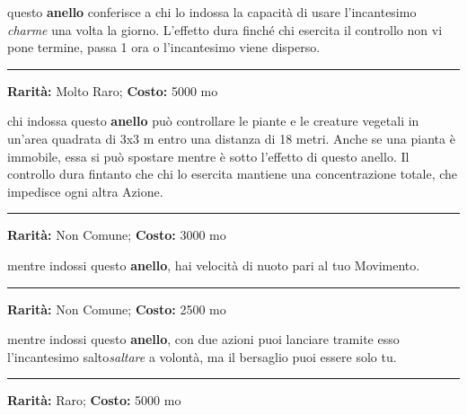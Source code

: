\begin{multicols}{2}
questo \textbf{anello} conferisce a chi lo indossa la capacità di usare l'incantesimo \emph{charme} una volta la giorno. L'effetto dura finché chi esercita il controllo non vi pone termine, passa 1 ora o l'incantesimo viene disperso.

\smallskip\noindent\rule{\linewidth}{2pt}  \hypertarget{AnellodelControllodellepiante}{}\smallskip{}\noindent\label{AnellodelControllodellepiante}

\textbf{Rarità:} Molto Raro; \textbf{Costo:} 5000 mo

chi indossa questo \textbf{anello} può controllare le piante e le creature vegetali in un'area quadrata di 3x3 m entro una distanza di 18 metri. Anche se una pianta è immobile, essa si può spostare mentre è sotto l'effetto di questo anello. Il controllo dura fintanto che chi lo esercita mantiene una concentrazione totale, che impedisce ogni altra Azione.

\smallskip\noindent\rule{\linewidth}{2pt}  \hypertarget{AnellodelNuoto}{}\smallskip{}\noindent\label{AnellodelNuoto}

\textbf{Rarità:} Non Comune; \textbf{Costo:} 3000 mo

mentre indossi questo \textbf{anello}, hai velocità di nuoto pari al tuo Movimento.

\smallskip\noindent\rule{\linewidth}{2pt}  \hypertarget{AnellodelSalto}{}\smallskip{}\noindent\label{AnellodelSalto}

\textbf{Rarità:} Non Comune; \textbf{Costo:} 2500 mo

mentre indossi questo \textbf{anello}, con due azioni puoi lanciare tramite esso l'incantesimo salto\emph{saltare} a volontà, ma il bersaglio puoi essere solo tu.

\smallskip\noindent\rule{\linewidth}{2pt}  \hypertarget{Anellodell'Ariete}{}\smallskip{}\noindent\label{Anellodell'Ariete}

\textbf{Rarità:} Raro; \textbf{Costo:} 5000 mo


\end{multicols}
